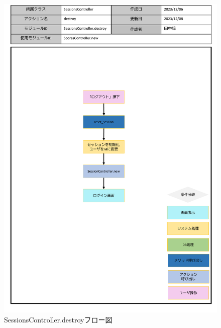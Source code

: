 \begin{figure}
    \centering
    \includegraphics[scale=0.6]{img/Sessions/pptx/SessionsController_destroy.pdf}
    \caption{SessionsController.destroyフロー図}
\end{figure}
